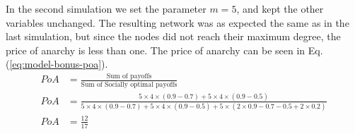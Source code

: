 In the second simulation we set the parameter $m=5$, and kept the other variables unchanged. The resulting network was as expected the same as in the last simulation, but since the nodes did not reach their maximum degree, the price of anarchy is less than one. The price of anarchy can be seen in Eq.(\ref{eq:model-bonus-poa}).
\begin{eqnarray}
PoA&=\frac{\text{Sum of payoffs}}{\text{Sum of Socially optimal payoffs}}  \nonumber \\
PoA&=\frac{5\times 4\times (0.9-0.7)+5\times 4\times(0.9-0.5)}{5\times 4\times (0.9-0.7)+5\times 4\times(0.9-0.5)+5\times (2\times 0.9-0.7-0.5 + 2 \times 0.2)}\nonumber \\
PoA&=\frac{12}{17}
\label{eq:model-bonus-poa}
\end{eqnarray}


